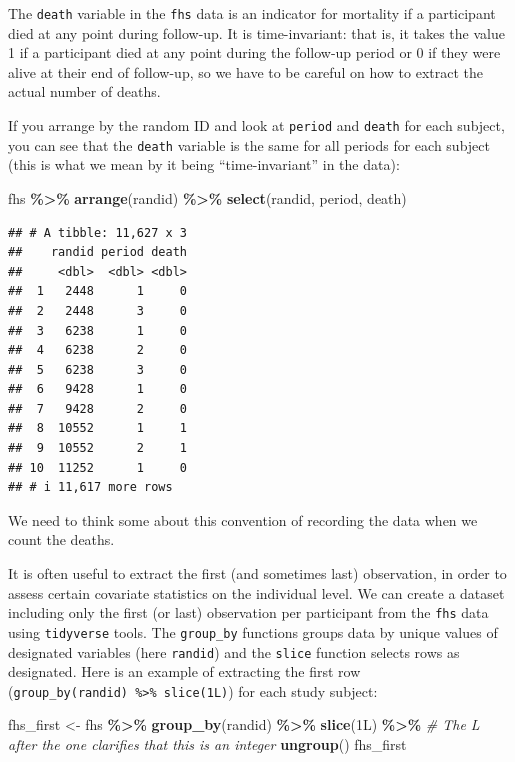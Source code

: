 \documentclass[
]{book}
\newenvironment{Shaded}{\begin{snugshade}}{\end{snugshade}}
\newcommand{\CommentTok}[1]{\textcolor[rgb]{0.56,0.35,0.01}{\textit{#1}}}
\newcommand{\DataTypeTok}[1]{\textcolor[rgb]{0.13,0.29,0.53}{#1}}
\newcommand{\DecValTok}[1]{\textcolor[rgb]{0.00,0.00,0.81}{#1}}
\newcommand{\FunctionTok}[1]{\textcolor[rgb]{0.13,0.29,0.53}{\textbf{#1}}}
\newcommand{\NormalTok}[1]{#1}
\newcommand{\OtherTok}[1]{\textcolor[rgb]{0.56,0.35,0.01}{#1}}
\newcommand{\SpecialCharTok}[1]{\textcolor[rgb]{0.81,0.36,0.00}{\textbf{#1}}}
\begin{document}
The \texttt{death} variable in the \texttt{fhs} data is an indicator for mortality if a participant died at any point during follow-up. It is time-invariant: that is, it takes the value 1 if a participant died at any point during the follow-up period or 0 if they were alive at their end of follow-up, so we have to be careful on how to extract the actual number of deaths.

If you arrange by the random ID and look at \texttt{period} and \texttt{death} for each subject,
you can see that the \texttt{death} variable is the same for all periods for each
subject (this is what we mean by it being ``time-invariant'' in the data):

\begin{Shaded}
\begin{Highlighting}[]
\NormalTok{fhs }\SpecialCharTok{\%\textgreater{}\%} 
  \FunctionTok{arrange}\NormalTok{(randid) }\SpecialCharTok{\%\textgreater{}\%} 
  \FunctionTok{select}\NormalTok{(randid, period, death)}
\end{Highlighting}
\end{Shaded}

\begin{verbatim}
## # A tibble: 11,627 x 3
##    randid period death
##     <dbl>  <dbl> <dbl>
##  1   2448      1     0
##  2   2448      3     0
##  3   6238      1     0
##  4   6238      2     0
##  5   6238      3     0
##  6   9428      1     0
##  7   9428      2     0
##  8  10552      1     1
##  9  10552      2     1
## 10  11252      1     0
## # i 11,617 more rows
\end{verbatim}

We need to think some about this convention of recording the data when we count
the deaths.

It is often useful to extract the first (and sometimes last) observation, in order to assess certain covariate statistics on the individual level. We can create a dataset including only the first (or last) observation per participant from the \texttt{fhs} data using \texttt{tidyverse} tools. The \texttt{group\_by} functions groups data by unique values of designated variables (here \texttt{randid}) and the \texttt{slice} function selects rows as designated. Here is an example of extracting the first row (\texttt{group\_by(randid)\ \%\textgreater{}\%\ slice(1L)}) for each study subject:

\begin{Shaded}
\begin{Highlighting}[]
\NormalTok{fhs\_first }\OtherTok{\textless{}{-}}\NormalTok{ fhs }\SpecialCharTok{\%\textgreater{}\%} 
  \FunctionTok{group\_by}\NormalTok{(randid) }\SpecialCharTok{\%\textgreater{}\%} 
  \FunctionTok{slice}\NormalTok{(}\DecValTok{1}\DataTypeTok{L}\NormalTok{) }\SpecialCharTok{\%\textgreater{}\%} \CommentTok{\# The L after the one clarifies that this is an integer}
  \FunctionTok{ungroup}\NormalTok{()}
\NormalTok{fhs\_first}
\end{Highlighting}
\end{Shaded}
\end{document}
